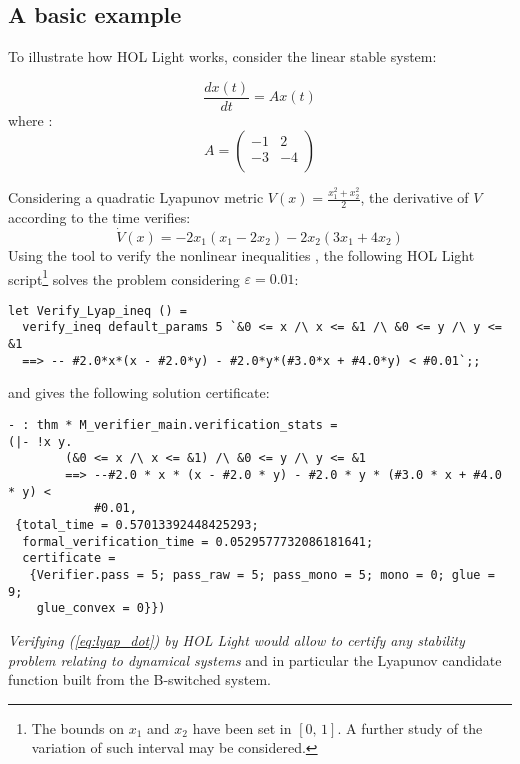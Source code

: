 \documentclass[12pt]{article}
\begin{document}
\subsection{A basic example}

To illustrate how HOL Light works, consider the linear stable system:

\begin{equation}\label{eq:SS_example}
\frac{d x(t)}{d t} = A x(t) 
\end{equation}
\noindent
where :
\begin{equation}
A = \left( \begin{array}{cc}
-1 & 2 \\
 -3 & -4 \\
 \end{array} \right)
 \end{equation}
 
\noindent
Considering a quadratic Lyapunov metric $\displaystyle{V(x) = \frac{x_1^2 + x_2^2}{2}}$, the derivative of $V$ according to the time verifies:
\begin{equation}\label{eq:lyap_dot}
\dot{V}(x) = - 2x_1(x_1 - 2x_2) - 2x_2(3x_1 + 4x_2)
\end{equation}
Using the tool to verify the nonlinear inequalities \cite{solo}, the following HOL Light script\footnote{The bounds on $x_1$ 
and $x_2$ have been set in $[0, \, 1]$. A further study of the variation of such interval may be considered.} solves the problem considering $\varepsilon = 0.01$:

\begin{verbatim}
let Verify_Lyap_ineq () =
  verify_ineq default_params 5 `&0 <= x /\ x <= &1 /\ &0 <= y /\ y <= &1 
  ==> -- #2.0*x*(x - #2.0*y) - #2.0*y*(#3.0*x + #4.0*y) < #0.01`;;
\end{verbatim}
\noindent
and gives the following solution certificate:

\begin{verbatim}
- : thm * M_verifier_main.verification_stats =
(|- !x y.
        (&0 <= x /\ x <= &1) /\ &0 <= y /\ y <= &1
        ==> --#2.0 * x * (x - #2.0 * y) - #2.0 * y * (#3.0 * x + #4.0 * y) <
            #0.01,
 {total_time = 0.57013392448425293;
  formal_verification_time = 0.0529577732086181641;
  certificate =
   {Verifier.pass = 5; pass_raw = 5; pass_mono = 5; mono = 0; glue = 9;
    glue_convex = 0}})
\end{verbatim}


{\it Verifying (\ref{eq:lyap_dot}) by HOL Light would allow to certify any stability problem relating to dynamical systems} and in particular the Lyapunov candidate 
function built from the B-switched system.
\end{document}
